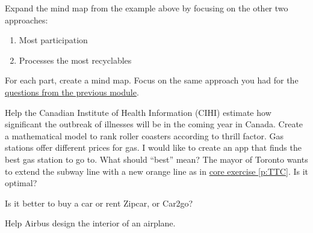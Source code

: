 \begin{exercises}
	\begin{problist}
		\prob
		Expand the mind map from the example above by focusing on the other two approaches:
		\begin{enumerate}
			\item Most participation
			\item Processes the most recyclables
		\end{enumerate}

		
	For each part, create a mind map. 
	Focus on the same approach you had for the \hyperref[exercise:define]{questions from the previous module}.

		\prob Help the Canadian Institute of Health Information (CIHI) estimate how significant the outbreak of illnesses will be in the coming year in Canada.
		\prob Create a mathematical model to rank roller coasters according to thrill factor.
		\prob Gas stations offer different prices for gas. I would like to create an app that finds the best gas station to go to. What should ``best'' mean?
		\prob The mayor of Toronto wants to extend the subway line with a new orange line as in \hyperref[p:TTC]{core exercise \ref{p:TTC}}. Is it optimal?
		
		\prob Is it better to buy a car or rent Zipcar, or Car2go?
		
		\prob Help Airbus design the interior of an airplane.

	\end{problist}
\end{exercises}
